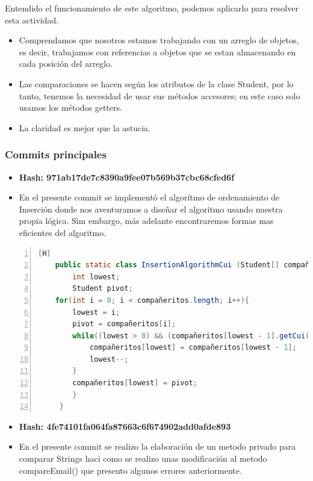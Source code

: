 Entendido el funcionamiento de este algoritmo, podemos aplicarlo para resolver esta actividad. 
  \begin{itemize}
    \item Comprendamos que nosotros estamos trabajando con un arreglo de objetos, es decir, trabajamos con referencias a objetos que se estan almacenando en cada posición del arreglo.
    \item Las comparaciones se hacen según los atributos de la clase Student, por lo tanto, tenemos la necesidad de usar sus métodos accesores; en este caso solo usamos los métodos getters.
    \item La claridad es mejor que la astucia.
  \end{itemize}

\subsubsection{Commits principales}
  \begin{itemize}
    \item \textbf{Hash: 971ab17de7c8390a9fee07b569b37cbc68cfed6f}
    \item En el presente commit se implementó el algorítmo de ordenamiento de Inserción donde nos aventuramos a diseñar el algoritmo usando nuestra propia lógica. Sim embargo, más adelante encontraremos formas mas eficientes del algoritmo.
  \end{itemize}
    \begin{lstlisting}[language=Java, caption={Commit: Se implementó Quicksort para cui}, numbers=left, firstnumber=1][H]
    public static class InsertionAlgorithmCui (Student[] compañeritos ) {
        int lowest;
        Student pivot;
	for(int i = 0; i < compañeritos.length; i++){
		lowest = i;
		pivot = compañeritos[i];
		while((lowest > 0) && (compañeritos[lowest - 1].getCui() > pivot.getCui())){
			compañeritos[lowest] = compañeritos[lowest - 1];
			lowest--;
		}
		compañeritos[lowest] = pivot;
	    }
     }
    \end{lstlisting}
  \begin{itemize}
    \item \textbf{Hash: 4fe74101fa064fa87663c6f674902add0afde893}
    \item En el presente commit se realizo la elaboración de un metodo privado para comparar Strings haci como se realizo unas modificación al metodo compareEmail() que presento algunos errores anteriormente. 
  \end{itemize}
